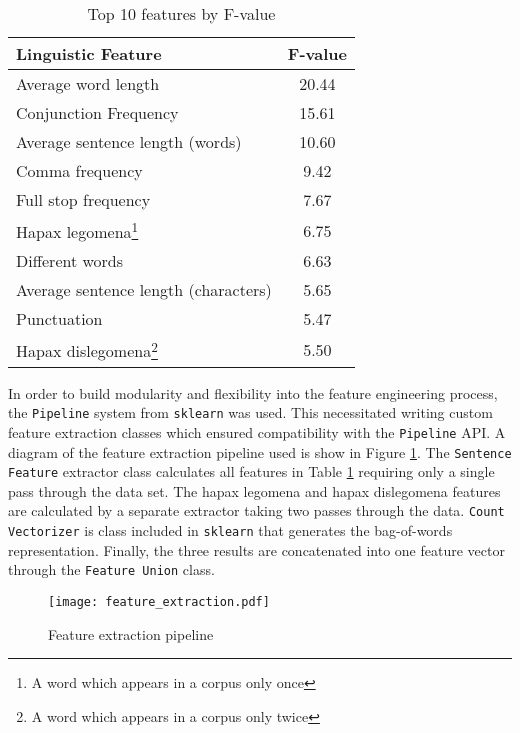 \documentclass[Dissertation.tex]{subfiles}
\begin{document}
\begin{table}[h]
	\centering
	\begin{minipage}{0.6\textwidth}
		\renewcommand*\footnoterule{}
		
		
		\caption{Top 10 features by F-value}
		\label{tab:fvalue}
		\begin{tabularx}{\linewidth}{X c}
			\toprule
			Linguistic Feature 			&	F-value\\ \midrule
			Average word length			&	20.44\\
			Conjunction Frequency		& 	15.61\\
			Average sentence length (words)	& 10.60\\
			Comma frequency				&	9.42\\
			Full stop frequency			&	7.67\\
			Hapax legomena\footnote{A word which appears in a corpus only once} & 6.75\\
			Different words				&	6.63\\
			Average sentence length (characters) & 5.65\\
			Punctuation 				&	5.47\\
			Hapax dislegomena\footnote{A word which appears in a corpus only twice} & 5.50\\
			\bottomrule
		\end{tabularx}
	\end{minipage}
\end{table}

In order to build modularity and flexibility into the feature engineering process, the \texttt{Pipeline} system from \texttt{sklearn} was used. This necessitated writing custom feature extraction classes which ensured compatibility with the \texttt{Pipeline} API. A diagram of the feature extraction pipeline used is show in Figure \ref{fig:featureExtraction}. The \texttt{Sentence Feature} extractor class calculates all features in Table \ref{tab:fvalue} requiring only a single pass through the data set. The hapax legomena and hapax dislegomena features are calculated by a separate extractor taking two passes through the data. \texttt{Count Vectorizer} is class included in \texttt{sklearn} that generates the bag-of-words representation. Finally, the three results are concatenated into one feature vector through the \texttt{Feature Union} class.
\begin{figure}
	\centering
	\texttt{[image: feature\_extraction.pdf]}
	\caption{Feature extraction pipeline}
	\label{fig:featureExtraction}
\end{figure} 
 
\end{document}
